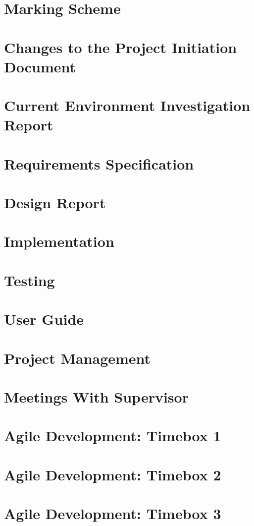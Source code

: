 \documentclass[a4paper,12pt]{report}
\begin{document}
\chapter{Marking Scheme}
\chapter{Changes to the Project Initiation Document}
\chapter{Current Environment Investigation Report}
\chapter{Requirements Specification}
\chapter{Design Report}
\chapter{Implementation}
\chapter{Testing}
\chapter{User Guide}
\chapter{Project Management}
\chapter{Meetings With Supervisor}
\chapter{Agile Development: Timebox 1}
\chapter{Agile Development: Timebox 2}
\chapter{Agile Development: Timebox 3}
\end{document}

